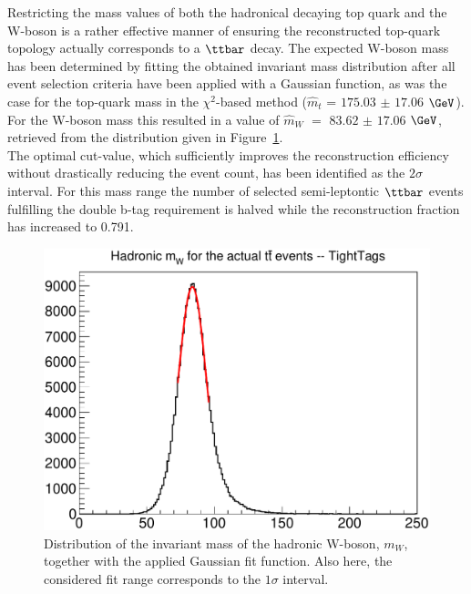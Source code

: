 Restricting the mass values of both the hadronical decaying top quark and the W-boson is a rather effective manner of ensuring the reconstructed top-quark topology actually corresponds to a $\ttbar$ decay.
The expected W-boson mass has been determined by fitting the obtained invariant mass distribution after all event selection criteria have been applied with a Gaussian function, as was the case for the top-quark mass in the $\chi^{2}$-based method ($\hat{m}_{t}$ = $175.03$ $\pm$ $17.06$ $\GeV$). For the W-boson mass this resulted in a value of $\hat{m}_{W}$ $=$ $83.62$ $\pm$ $17.06$ $\GeV$, retrieved from the distribution given in Figure~\ref{fig::InvWMass}.
\\
The optimal cut-value, which sufficiently improves the reconstruction efficiency without drastically reducing the event count, has been identified as the $2\sigma$ interval. For this mass range the number of selected semi-leptontic $\ttbar$ events fulfilling the double b-tag requirement is halved while the reconstruction fraction has increased to 0.791.
\begin{figure}[h!t]
 \centering
 \includegraphics[width = 0.7 \textwidth]{Chapters/Chapter4_EvtSel/Figures/HadrMWMassDistr.pdf}  %
 \caption{Distribution of the invariant mass of the hadronic W-boson, $m_{W}$, together with the applied Gaussian fit function. Also here, the considered fit range corresponds to the $1\sigma$ interval.} \label{fig::InvWMass}
\end{figure}

